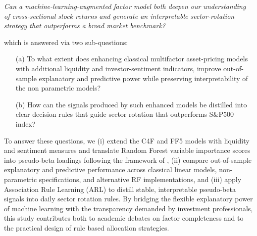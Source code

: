 \textit{Can a machine-learning-augmented factor model both deepen our understanding of cross-sectional stock returns and generate an interpretable sector-rotation strategy that outperforms a broad market benchmark?}

which is answered via two sub-questions:
\begin{enumerate}
   \item[(a)] To what extent does enhancing classical multifactor asset-pricing models with additional liquidity and investor-sentiment indicators, improve out-of-sample explanatory and predictive power while preserving interpretability of the non parametric models?\\
  \item[(b)] How can the signals produced by such enhanced models be distilled into clear decision rules that guide sector rotation that outperforms S\&P500 index?\\
\end{enumerate}

To answer these questions, we (i) extend the C4F and FF5 models with liquidity and sentiment measures and translate Random Forest variable importance scores into pseudo-beta loadings following the framework of , (ii) compare out-of-sample explanatory and predictive performance across classical linear models, non-parametric specifications, and alternative RF implementations, and (iii) apply Association Rule Learning (ARL) to distill stable, interpretable pseudo-beta signals into daily sector rotation rules. By bridging the flexible explanatory power of machine learning with the transparency demanded by investment professionals, this study contributes both to academic debates on factor completeness and to the practical design of rule based allocation strategies. 


